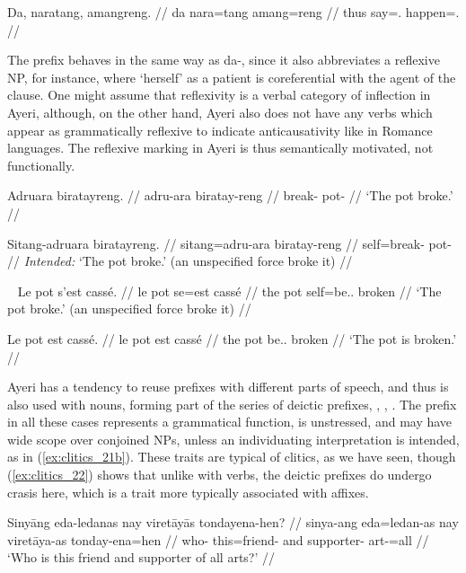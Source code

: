 \ex\label{ex:clitics_18}\begingl
	\gla Da, naratang, amangreng. //
	\glb da nara=tang amang=reng //
	\glc thus say=\TplM{}.\Aarg{} happen=\TsgI{}.\Aarg{} //
\endgl\xe

The prefix  behaves in the same way as 
{da-}, since it also abbreviates a reflexive NP, for instance,
 where `herself' as a patient is
coreferential with the agent of the clause. One might assume that reflexivity
is a verbal category of inflection in Ayeri, although, on the other hand, Ayeri
also does not have any verbs which appear as grammatically reflexive to
indicate anticausativity like in Romance languages. The reflexive marking in
Ayeri is thus semantically motivated, not functionally.

\pex\label{ex:clitics_19}
\a\label{ex:clitics_19a}\begingl
	\gla Adruara biratayreng. //
	\glb adru-ara biratay-reng //
	\glc break-\TsgI{} pot-\AargI{} //
	\glft `The pot broke.' //
\endgl

\a\label{ex:clitics_19b}\ljudge{*}\begingl
	\gla Sitang-adruara biratayreng. //
	\glb sitang=adru-ara biratay-reng //
	\glc self=break-\TsgI{} pot-\AargI{} //
	\glft \textit{Intended:} `The pot broke.' (an unspecified force broke it) //
\endgl
\xe

\pex~\label{ex:clitics_20}
\a\label{ex:clitics_20a}\begingl{}%
	\gla Le pot s'est cassé. //
	\glb le pot se=est cassé //
	\glc the pot self=be.\Tsg{}.\Prs{} broken //
	\glft `The pot broke.' (an unspecified force broke it) //
\endgl

\a\label{ex:clitics_20b}\begingl
	\gla Le pot est cassé. //
	\glb le pot est cassé //
	\glc the pot be.\Tsg{}.\Prs{} broken //
	\glft `The pot is broken.' //
\endgl
\xe

Ayeri has a tendency to reuse prefixes with different parts of speech, and thus
 is also used with nouns, forming part of the series of deictic
prefixes, , ,
. The prefix in all these cases represents a grammatical
function, is unstressed, and may have wide scope over conjoined NPs, unless an
individuating interpretation is intended, as in (\ref{ex:clitics_21b}). These
traits are typical of clitics, as we have seen, though (\ref{ex:clitics_22})
shows that unlike with verbs, the deictic prefixes do undergo crasis here, 
which is a trait more typically associated with affixes.

\pex\label{ex:clitics_21}
\a\label{ex:clitics_21a}\begingl
	\gla Sinyāng eda-ledanas nay viretāyās tondayena-hen? //
	\glb sinya-ang eda=ledan-as nay viretāya-as tonday-ena=hen //
	\glc who-\Aarg{} this=friend-\Parg{} and supporter-\Parg{} 
		art-\Gen{}=all //
	\glft `Who is this friend and supporter of all arts?' //
\endgl

